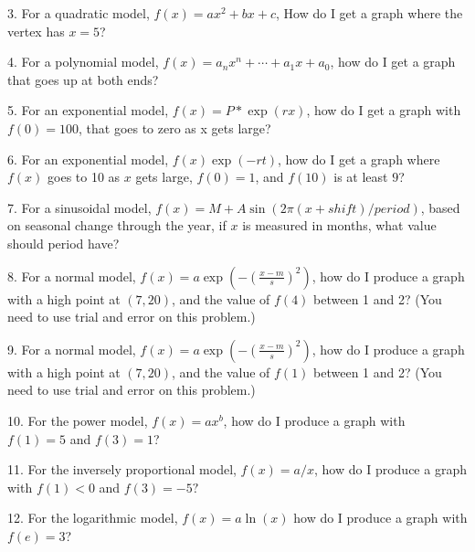 \documentclass[10pt,]{book}
\theoremstyle{plain}
\theoremstyle{definition}
\theoremstyle{definition}
\newcommand{\lt}{ < }
\begin{document}
\begin{exerciselist}
%
\par\smallskip
\item[3.]\hypertarget{exercise-23}{} For a quadratic model, \(f(x)=a x^2+b x+c\), How do I get a graph where the vertex has \(x=5\)?
%
\par\smallskip
\item[4.]\hypertarget{exercise-24}{} For a polynomial model, \(f(x)=a_n x^n+\cdots+a_1 x+a_0\), how do I get a graph that goes up at both ends?
%
\par\smallskip
\item[5.]\hypertarget{exercise-25}{} For an exponential model, \(f(x)=P*\exp(r x)\), how do I get a graph with \(f(0)=100\), that goes to zero as x gets large?
%
\par\smallskip
\item[6.]\hypertarget{exercise-26}{} For an exponential model, \(f(x)\exp(-r t)\), how do I get a graph where \(f(x)\) goes to 10 as \(x\) gets large, \(f(0)=1\), and \(f(10)\) is at least \(9\)?
%
\par\smallskip
\item[7.]\hypertarget{exercise-27}{} For a sinusoidal model, \(f(x)=M+A \sin(2\pi(x+shift)/period)\), based on seasonal change through the year, if \(x\) is measured in months, what value should period have?
%
\par\smallskip
\item[8.]\hypertarget{exercise-28}{} For a normal model, 
\(f(x)=a \exp\left(-\left(\frac{x-m}{s}\right)^2\right)\), how do I produce a graph with a high point at \((7, 20)\), and the value of \(f(4)\) between 1 and 2?  (You need to use trial and error on this problem.)
%
\par\smallskip
\item[9.]\hypertarget{exercise-29}{} For a normal model, 
\(f(x)=a \exp\left(-\left(\frac{x-m}{s}\right)^2\right)\), how do I produce a graph with a high point at \((7, 20)\), and the value of \(f(1)\) between 1 and 2?  (You need to use trial and error on this problem.)
%
\par\smallskip
\item[10.]\hypertarget{exercise-30}{} For the power model, \(f(x)=a x^b\), how do I produce a graph with \(f(1)=5\) and \(f(3)=1\)?%
\par\smallskip
\item[11.]\hypertarget{exercise-31}{} For the inversely proportional model, \(f(x)=a/x\), how do I produce a graph with \(f(1) \lt 0\) and \(f(3)=-5?\)%
\par\smallskip
\item[12.]\hypertarget{exercise-32}{} For the logarithmic model, \(f(x)=a \ln(x)\) how do I produce a graph with \(f(e)=3\)?%

\end{exerciselist}
\end{document}
